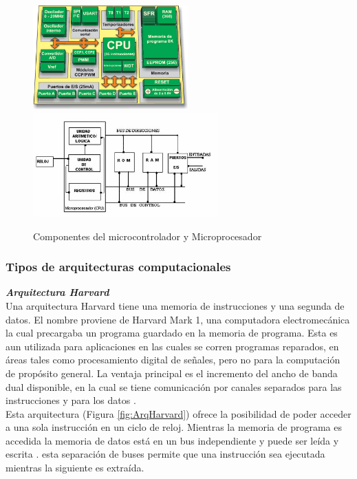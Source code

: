 \documentclass[12pt,a4paper]{article}
\begin{document}
   \begin{figure}[htpb]
   \centering
   \includegraphics[height=4cm]{MicrocontroladorPartes}
   \hspace{1cm}
   \includegraphics[height=4cm]{MicroprocesadorPartes}
   \caption{Componentes del microcontrolador y Microprocesador}
   \label{fig:ComponentesMicros}
   \end{figure}
   
   
  \subsubsection{Tipos de arquitecturas computacionales}
  \textbf{\textit{Arquitectura Harvard}}\\
  Una arquitectura Harvard tiene una memoria de instrucciones y una segunda de datos. El nombre proviene de Harvard Mark 1, una computadora electromecánica la cual precargaba un programa guardado en la memoria de programa. Esta es aun utilizada para aplicaciones en las cuales se corren programas reparados, en áreas tales como procesamiento digital de señales, pero no para la computación de propósito general. La ventaja principal es el incremento del ancho de banda dual disponible, en la cual se tiene comunicación por canales separados para las instrucciones y para los datos \cite{Furber}.\\
  Esta arquitectura (Figura \ref{fig:ArqHarvard}) ofrece la posibilidad de poder acceder a una sola instrucción en un ciclo de reloj. Mientras la memoria de programa es accedida la memoria de datos está en un bus independiente y puede ser leída y escrita . esta separación de buses permite que una instrucción sea ejecutada mientras la siguiente es extraída.
   \\ \\ 
   
\end{document}
